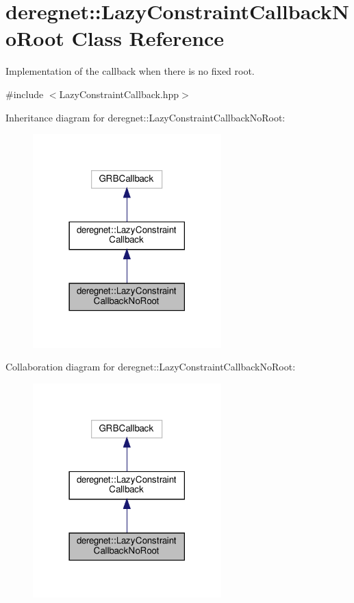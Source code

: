 \hypertarget{classderegnet_1_1LazyConstraintCallbackNoRoot}{}\section{deregnet\+:\+:Lazy\+Constraint\+Callback\+No\+Root Class Reference}
\label{classderegnet_1_1LazyConstraintCallbackNoRoot}


Implementation of the callback when there is no fixed root.  




{\ttfamily \#include $<$Lazy\+Constraint\+Callback.\+hpp$>$}



Inheritance diagram for deregnet\+:\+:Lazy\+Constraint\+Callback\+No\+Root\+:\nopagebreak
\begin{figure}[H]
\begin{center}
\leavevmode
\includegraphics[width=206pt]{classderegnet_1_1LazyConstraintCallbackNoRoot__inherit__graph}
\end{center}
\end{figure}


Collaboration diagram for deregnet\+:\+:Lazy\+Constraint\+Callback\+No\+Root\+:\nopagebreak
\begin{figure}[H]
\begin{center}
\leavevmode
\includegraphics[width=206pt]{classderegnet_1_1LazyConstraintCallbackNoRoot__coll__graph}
\end{center}
\end{figure}
